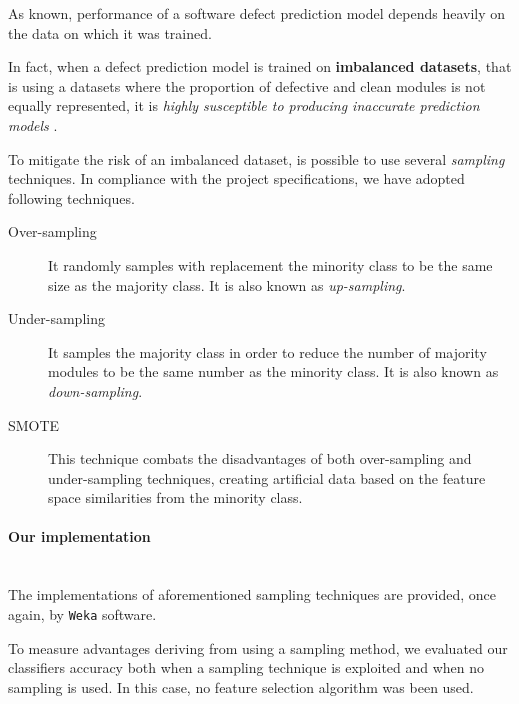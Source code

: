 \documentclass[sigconf]{acmart}
\begin{document}
As known, performance of a software defect prediction model depends heavily on the data on which it was trained.

In fact, when a defect prediction model is trained on \textbf{imbalanced datasets}, that is using a datasets where the proportion of defective and clean modules is not equally represented, it is \textit{highly susceptible to producing inaccurate prediction models} \cite{FalessiSampling}.

To mitigate the risk of an imbalanced dataset, is possible to use several \textit{sampling} techniques. In compliance with the project specifications, we have adopted following techniques.

\begin{description}
\item[Over-sampling] It randomly samples with replacement the minority class to be the same size as the majority class. It is also known as \textit{up-sampling}.

\item[Under-sampling] It samples the majority class in order to reduce the number of majority modules to be the same number as the minority class. It is also known as \textit{down-sampling}.

\item[SMOTE] This technique combats the disadvantages of both over-sampling and under-sampling techniques, creating artificial data based on the feature space similarities from the minority class. 

\end{description}

\paragraph{Our implementation}
\hfill\\
The implementations of aforementioned sampling techniques are provided, once again, by \texttt{Weka} software.

To measure advantages deriving from using a sampling method, we evaluated our classifiers accuracy both when a sampling technique is exploited and when no sampling is used. In this case, no feature selection algorithm was been used.
\end{document}
